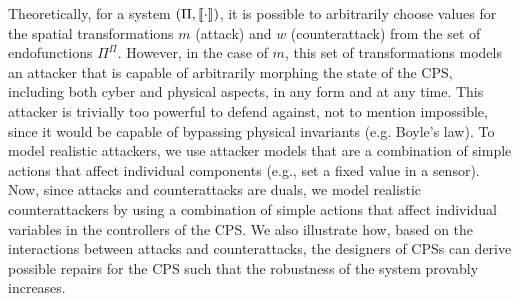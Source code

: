 {%
}


Theoretically, for a system $(\Pi,{{{\llbracket\cdot\rrbracket}}})$, %
it is possible to arbitrarily choose values for the spatial transformations $m$ (attack) and $w$ (counterattack) from the set of endofunctions $\Pi^{\Pi}$.  However, in the case of $m$, this set of transformations models an attacker that is capable of arbitrarily morphing the state of the CPS, including both cyber and physical aspects, in any form and at any time. This attacker is trivially too powerful to defend against, not to mention impossible, since it would be capable of bypassing physical invariants (e.g. Boyle's law). To model realistic attackers, we use attacker models that are a combination of simple actions that affect individual components (e.g., set a fixed value in a sensor). Now, since attacks and counterattacks are duals, we model realistic counterattackers by using a combination of simple actions that affect individual variables in the controllers of the CPS. We also illustrate how, based on the interactions between attacks and counterattacks, the designers of CPSs can derive possible repairs for the CPS such that the robustness of the system provably increases.


